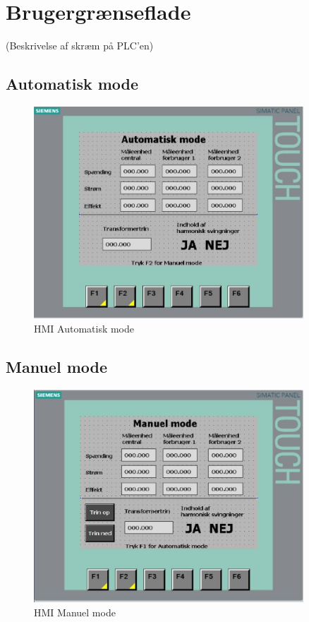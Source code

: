 
\section{Brugergrænseflade}
(Beskrivelse af skræm på PLC’en) \\
\subsection{Automatisk mode}
\begin{figure}[H] %
	\centering
	\includegraphics[width=0.9\textwidth]{Figure/HMIAutomatiskMode}
	\caption{HMI Automatisk mode}
	\label{fig:HMIAutomatikMode}
\end{figure}



\subsection{Manuel mode}
\begin{figure}[H] %
	\centering
	\includegraphics[width=0.9\textwidth]{Figure/HMIManuelMode}
	\caption{HMI Manuel mode}
	\label{fig:HMIManuelMode}
\end{figure}